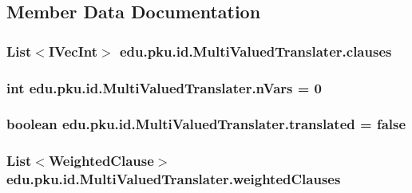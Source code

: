 \subsection{Member Data Documentation}
\hypertarget{classedu_1_1pku_1_1id_1_1_multi_valued_translater_ac5e73cd4928c489b13949689250bdd33}{
\subsubsection[{clauses}]{\setlength{\rightskip}{0pt plus 5cm}List$<$IVecInt$>$ {\bf edu.pku.id.MultiValuedTranslater.clauses}}}
\label{classedu_1_1pku_1_1id_1_1_multi_valued_translater_ac5e73cd4928c489b13949689250bdd33}
\hypertarget{classedu_1_1pku_1_1id_1_1_multi_valued_translater_ac32ccbcc28ed991632d9d95eeb10f279}{
\subsubsection[{nVars}]{\setlength{\rightskip}{0pt plus 5cm}int {\bf edu.pku.id.MultiValuedTranslater.nVars} = 0}}
\label{classedu_1_1pku_1_1id_1_1_multi_valued_translater_ac32ccbcc28ed991632d9d95eeb10f279}
\hypertarget{classedu_1_1pku_1_1id_1_1_multi_valued_translater_a201fef561c0cfbcd87bae63db0ec4c1a}{
\subsubsection[{translated}]{\setlength{\rightskip}{0pt plus 5cm}boolean {\bf edu.pku.id.MultiValuedTranslater.translated} = false}}
\label{classedu_1_1pku_1_1id_1_1_multi_valued_translater_a201fef561c0cfbcd87bae63db0ec4c1a}
\hypertarget{classedu_1_1pku_1_1id_1_1_multi_valued_translater_af8448dcc0a0420748f9d331c0be01ef2}{
\subsubsection[{weightedClauses}]{\setlength{\rightskip}{0pt plus 5cm}List$<${\bf WeightedClause}$>$ {\bf edu.pku.id.MultiValuedTranslater.weightedClauses}}}
\label{classedu_1_1pku_1_1id_1_1_multi_valued_translater_af8448dcc0a0420748f9d331c0be01ef2}


